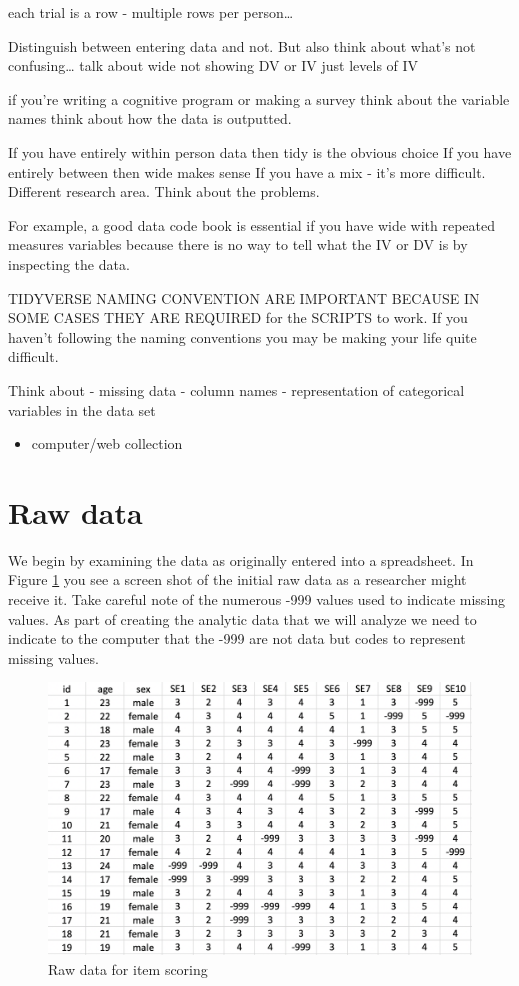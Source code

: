 \documentclass[
]{krantz}
\providecommand{\tightlist}{%
  \setlength{\itemsep}{0pt}\setlength{\parskip}{0pt}}
\begin{document}
each trial is a row - multiple rows per person\ldots{}

Distinguish between entering data and not. But also think about what's not confusing\ldots{}
talk about wide not showing DV or IV just levels of IV

if you're writing a cognitive program or making a survey think about the variable names
think about how the data is outputted.

If you have entirely within person data then tidy is the obvious choice
If you have entirely between then wide makes sense
If you have a mix - it's more difficult. Different research area. Think about the problems.

For example, a good data code book is essential if you have wide with repeated measures variables because there is no way to tell what the IV or DV is by inspecting the data.

TIDYVERSE NAMING CONVENTION ARE IMPORTANT BECAUSE IN SOME CASES THEY ARE REQUIRED for the SCRIPTS to work. If you haven't following the naming conventions you may be making your life quite difficult.

Think about
- missing data
- column names
- representation of categorical variables in the data set

\begin{itemize}
\tightlist
\item
  computer/web collection
\end{itemize}

\hypertarget{raw-data}{%
\section{Raw data}\label{raw-data}}

We begin by examining the data as originally entered into a spreadsheet. In Figure \ref{fig:rawdataitems} you see a screen shot of the initial raw data as a researcher might receive it. Take careful note of the numerous -999 values used to indicate missing values. As part of creating the analytic data that we will analyze we need to indicate to the computer that the -999 are not data but codes to represent missing values.

\begin{figure}
\includegraphics[width=0.85\linewidth]{ch_score_items/images/screenshot_raw_data} \caption{Raw data for item scoring}\label{fig:rawdataitems}
\end{figure}
\end{document}
